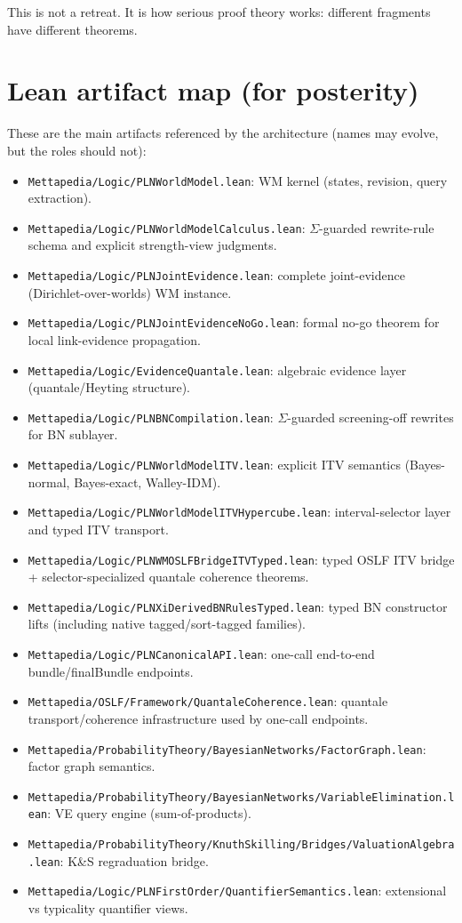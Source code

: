 \documentclass[11pt]{article}
\begin{document}
This is not a retreat. It is how serious proof theory works: different fragments have different theorems.

\section{Lean artifact map (for posterity)}

These are the main artifacts referenced by the architecture (names may evolve, but the roles should not):

\begin{itemize}[leftmargin=2em]
\item \texttt{Mettapedia/Logic/PLNWorldModel.lean}: WM kernel (states, revision, query extraction).
\item \texttt{Mettapedia/Logic/PLNWorldModelCalculus.lean}: $\Sigma$-guarded rewrite-rule schema
and explicit strength-view judgments.
\item \texttt{Mettapedia/Logic/PLNJointEvidence.lean}: complete joint-evidence (Dirichlet-over-worlds) WM instance.
\item \texttt{Mettapedia/Logic/PLNJointEvidenceNoGo.lean}: formal no-go theorem for local link-evidence propagation.
\item \texttt{Mettapedia/Logic/EvidenceQuantale.lean}: algebraic evidence layer (quantale/Heyting structure).
\item \texttt{Mettapedia/Logic/PLNBNCompilation.lean}: $\Sigma$-guarded screening-off rewrites for BN sublayer.
\item \texttt{Mettapedia/Logic/PLNWorldModelITV.lean}: explicit ITV semantics (Bayes-normal, Bayes-exact, Walley-IDM).
\item \texttt{Mettapedia/Logic/PLNWorldModelITVHypercube.lean}: interval-selector layer and typed ITV transport.
\item \texttt{Mettapedia/Logic/PLNWMOSLFBridgeITVTyped.lean}: typed OSLF ITV bridge + selector-specialized quantale coherence theorems.
\item \texttt{Mettapedia/Logic/PLNXiDerivedBNRulesTyped.lean}: typed BN constructor lifts (including native tagged/sort-tagged families).
\item \texttt{Mettapedia/Logic/PLNCanonicalAPI.lean}: one-call end-to-end bundle/finalBundle endpoints.
\item \texttt{Mettapedia/OSLF/Framework/QuantaleCoherence.lean}: quantale transport/coherence infrastructure used by one-call endpoints.
\item \texttt{Mettapedia/ProbabilityTheory/BayesianNetworks/FactorGraph.lean}: factor graph semantics.
\item \texttt{Mettapedia/ProbabilityTheory/BayesianNetworks/VariableElimination.lean}: VE query engine (sum-of-products).
\item \texttt{Mettapedia/ProbabilityTheory/KnuthSkilling/Bridges/ValuationAlgebra.lean}: K\&S regraduation bridge.
\item \texttt{Mettapedia/Logic/PLNFirstOrder/QuantifierSemantics.lean}: extensional vs typicality quantifier views.
\end{itemize}
\end{document}
